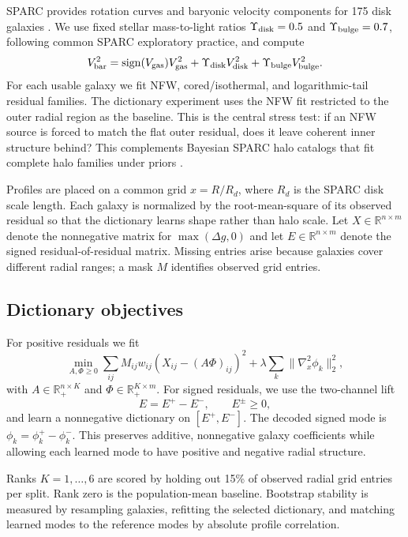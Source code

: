 \documentclass[10pt,twocolumn]{article}
\newcommand{\R}{\mathbb{R}}
\newcommand{\Dg}{\Delta g}
\begin{document}
SPARC provides rotation curves and baryonic velocity components for 175 disk
galaxies \citep{Lelli2016}. We use fixed stellar mass-to-light ratios
$\Upsilon_{\rm disk}=0.5$ and $\Upsilon_{\rm bulge}=0.7$, following common
SPARC exploratory practice, and compute
\begin{equation}
V_{\rm bar}^2
=
\operatorname{sign}(V_{\rm gas})V_{\rm gas}^2
+\Upsilon_{\rm disk}V_{\rm disk}^2
+\Upsilon_{\rm bulge}V_{\rm bulge}^2 .
\end{equation}
For each usable galaxy we fit NFW, cored/isothermal, and logarithmic-tail
residual families. The dictionary experiment uses the NFW fit restricted to
the outer radial region as the baseline. This is the central stress test: if an
NFW source is forced to match the flat outer residual, does it leave coherent
inner structure behind?
This complements Bayesian SPARC halo catalogs that fit complete halo families
under priors \citep{Li2020}.

Profiles are placed on a common grid $x=R/R_d$, where $R_d$ is the SPARC disk
scale length. Each galaxy is normalized by the root-mean-square of its observed
residual so that the dictionary learns shape rather than halo scale. Let
$X\in\R^{n\times m}$ denote the nonnegative matrix for
$\max(\Dg,0)$ and let $E\in\R^{n\times m}$ denote the signed
residual-of-residual matrix. Missing entries arise because galaxies cover
different radial ranges; a mask $M$ identifies observed grid entries.

\subsection{Dictionary objectives}

For positive residuals we fit
\begin{equation}
\min_{A,\Phi\ge 0}
\sum_{ij} M_{ij}w_{ij}
\left(X_{ij}-(A\Phi)_{ij}\right)^2
+\lambda\sum_k \|\nabla_x^2\phi_k\|_2^2 ,
\label{eq:nmf}
\end{equation}
with $A\in\R_+^{n\times K}$ and $\Phi\in\R_+^{K\times m}$.
For signed residuals, we use the two-channel lift
\begin{equation}
E=E^+-E^-,
\qquad
E^\pm\ge 0,
\end{equation}
and learn a nonnegative dictionary on $[E^+,E^-]$. The decoded signed mode is
$\phi_k=\phi_k^+-\phi_k^-$. This preserves additive, nonnegative galaxy
coefficients while allowing each learned mode to have positive and negative
radial structure.

Ranks $K=1,\ldots,6$ are scored by holding out 15\% of observed radial grid
entries per split. Rank zero is the population-mean baseline. Bootstrap
stability is measured by resampling galaxies, refitting the selected
dictionary, and matching learned modes to the reference modes by absolute
profile correlation.
\end{document}

